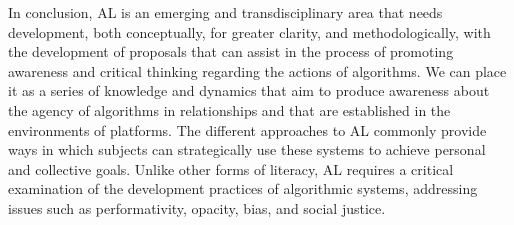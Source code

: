 In conclusion, AL is an emerging and transdisciplinary area that needs development, both conceptually, for greater clarity, and methodologically, with the development of proposals that can assist in the process of promoting awareness and critical thinking regarding the actions of algorithms. We can place it as a series of knowledge and dynamics that aim to produce awareness about the agency of algorithms in relationships and that are established in the environments of platforms. The different approaches to AL commonly provide ways in which subjects can strategically use these systems to achieve personal and collective goals. Unlike other forms of literacy, AL requires a critical examination of the development practices of algorithmic systems, addressing issues such as performativity, opacity, bias, and social justice.
